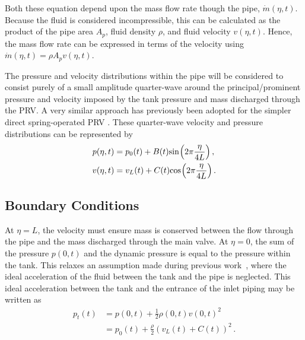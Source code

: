 Both these equation depend upon the mass flow rate though the pipe, $\dot{m}(\eta,t)$. Because the fluid is considered incompressible, this can be calculated as the product of the pipe area $A_p$, fluid density $\rho$, and fluid velocity $v(\eta,t)$. Hence, the mass flow rate can be expressed in terms of the velocity using $\dot{m}(\eta,t) = \rho A_p v(\eta,t)$.

The pressure and velocity distributions within the pipe will be considered to consist purely of a small amplitude quarter-wave around the principal/prominent pressure and velocity imposed by the tank pressure and mass discharged through the PRV. A very similar approach has previously been adopted for the simpler direct spring-operated PRV \cite{Hos2016DynamicService,Hos2015ModelPipe}. These quarter-wave velocity and pressure distributions can be represented by
~
\begin{equation} \label{eq: PressVelDist}
\begin{split}
    p(\eta,t) &= p_0(t) + B(t) \fun{sin}{2\pi \frac{\eta}{4L}} \, ,\\
    v(\eta,t) &= v_L(t) + C(t) \fun{cos}{2\pi \frac{\eta}{4L}} \, .
\end{split}
\end{equation}

\subsection{Boundary Conditions}

At $\eta = L$, the velocity must ensure mass is conserved between the flow through the pipe and the mass discharged through the main valve. At $\eta = 0$, the sum of the pressure $p(0,t)$ and the dynamic pressure is equal to the pressure within the tank. This relaxes an assumption made during previous work~\cite{Hos2015ModelPipe}, where the ideal acceleration of the fluid between the tank and the pipe is neglected. This ideal acceleration between the tank and the entrance of the inlet piping may be written as
~
\begin{equation} \label{eq: QWMBoundary1}
\begin{split}
    p_t(t) &= p(0,t) + \frac{1}{2} \rho(0,t) v(0,t)^2 \\
           &= p_0(t) + \frac{\rho}{2} \left( v_L(t) + C(t) \right)^2 \, .
\end{split}
\end{equation}

